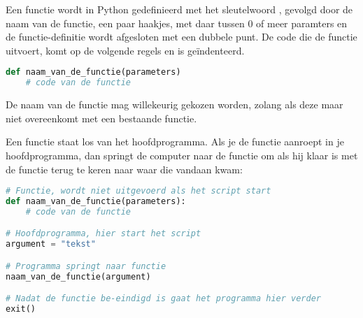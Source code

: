 Een functie wordt in Python gedefinieerd met het sleutelwoord , gevolgd door de naam van de functie, een paar haakjes, met daar tussen 0 of meer paramters en de functie-definitie wordt afgesloten met een dubbele punt. De code die de functie uitvoert, komt op de volgende regels en is ge\"indenteerd.
\begin{lstlisting}[language=python]
def naam_van_de_functie(parameters)
    # code van de functie
\end{lstlisting}

De naam van de functie mag willekeurig gekozen worden, zolang als deze maar niet overeenkomt met een bestaande functie.

Een functie staat los van het hoofdprogramma. Als je de functie aanroept in je hoofdprogramma, dan springt de computer naar de functie om als hij klaar is met de functie terug te keren naar waar die vandaan kwam:
\begin{lstlisting}[language=python]
# Functie, wordt niet uitgevoerd als het script start
def naam_van_de_functie(parameters):
    # code van de functie

# Hoofdprogramma, hier start het script
argument = "tekst"

# Programma springt naar functie
naam_van_de_functie(argument)

# Nadat de functie be-eindigd is gaat het programma hier verder
exit()
\end{lstlisting}

